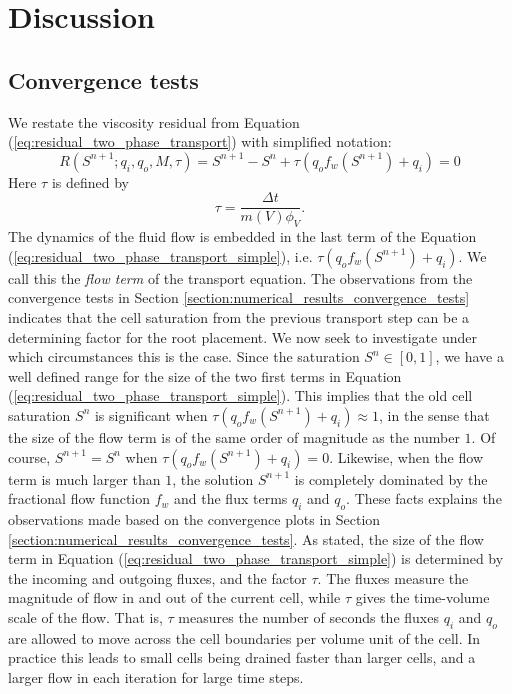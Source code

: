 \chapter{Discussion} \thispagestyle{chapterpage}
\label{chapter:discussion}

\section{Convergence tests}
\label{section:discussion_convergence_tests}
We restate the viscosity residual from Equation (\ref{eq:residual_two_phase_transport}) with simplified notation:
\begin{equation} \label{eq:residual_two_phase_transport_simple}
R(S^{n+1};q_i,q_o,M,\tau) = S^{n+1} - S^{n} + \tau \left(q_o f_w(S^{n+1}) + q_i\right) = 0
\end{equation}
Here $\tau$ is defined by
\begin{equation*}
\tau = \frac{\Delta t}{m(V) \phi_V}.
\end{equation*}
The dynamics of the fluid flow is embedded in the last term of the Equation (\ref{eq:residual_two_phase_transport_simple}), i.e. $\tau \left(q_o f_w(S^{n+1}) + q_i\right)$. We call this the \emph{flow term} of the transport equation. The observations from the convergence tests in Section \ref{section:numerical_results_convergence_tests} indicates that the cell saturation from the previous transport step can be a determining factor for the root placement. We now seek to investigate under which circumstances this is the case. Since the saturation $S^n \in [0,1]$, we have a well defined range for the size of the two first terms in Equation (\ref{eq:residual_two_phase_transport_simple}). This implies that the old cell saturation $S^n$ is significant when $\tau \left(q_o f_w(S^{n+1}) + q_i\right) \approx 1$, in the sense that the size of the flow term is of the same order of magnitude as the number $1$. Of course, $S^{n+1} = S^n$ when $\tau \left(q_o f_w(S^{n+1}) + q_i\right) = 0$. Likewise, when the flow term is much larger than $1$, the solution $S^{n+1}$ is completely dominated by the fractional flow function $f_w$ and the flux terms $q_i$ and $q_o$. These facts explains the observations made based on the convergence plots in Section \ref{section:numerical_results_convergence_tests}. As stated, the size of the flow term in Equation (\ref{eq:residual_two_phase_transport_simple}) is determined by the incoming and outgoing fluxes, and the factor $\tau$. The fluxes measure the magnitude of flow in and out of the current cell, while $\tau$ gives the time-volume scale of the flow. That is, $\tau$ measures the number of seconds the fluxes $q_i$ and $q_o$ are allowed to move across the cell boundaries per volume unit of the cell. In practice this leads to small cells being drained faster than larger cells, and a larger flow in each iteration for large time steps.

